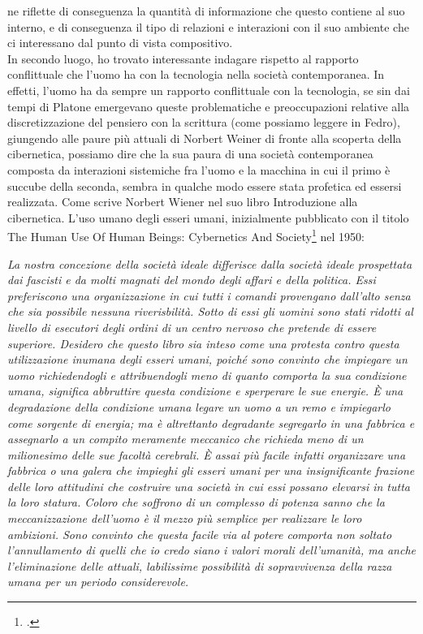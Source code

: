 ne riflette di conseguenza la quantità di informazione che questo contiene al suo interno,
e di conseguenza il tipo di relazioni e interazioni con il suo ambiente che 
ci interessano dal punto di vista compositivo.\\
In secondo luogo, ho trovato interessante indagare rispetto al rapporto conflittuale che l'uomo ha con la tecnologia
nella società contemporanea. 
In effetti, l'uomo ha da sempre un rapporto conflittuale con la tecnologia,
se sin dai tempi di Platone emergevano queste problematiche e preoccupazioni
relative alla discretizzazione del pensiero con la scrittura
(come possiamo leggere in Fedro), 
giungendo alle paure più attuali di Norbert Weiner di fronte
alla scoperta della cibernetica, possiamo dire che la sua paura di una società contemporanea 
composta da interazioni sistemiche fra l'uomo e la macchina
in cui il primo è succube della seconda, sembra in qualche modo essere stata profetica ed essersi realizzata.
Come scrive Norbert Wiener nel suo libro Introduzione alla cibernetica. L'uso umano degli esseri umani,
inizialmente pubblicato con il titolo The Human Use Of Human Beings: Cybernetics And Society\footcite{wiener_introduzione_nodate}
nel 1950:

\begin{center}
    \vspace{0.5cm}
    \textit{La nostra concezione della società ideale differisce dalla società ideale
    prospettata dai fascisti e da molti magnati del mondo degli affari 
    e della politica.
    Essi preferiscono una organizzazione in cui tutti i comandi
    provengano dall'alto senza che sia possibile nessuna riverisbilità.
    Sotto di essi gli uomini sono stati ridotti al livello di esecutori degli ordini
    di un centro nervoso che pretende di essere superiore.
    Desidero che questo libro sia inteso come una protesta contro questa
    utilizzazione inumana degli esseri umani, poiché sono convinto che impiegare
    un uomo richiedendogli e attribuendogli meno di quanto comporta la sua condizione umana,
    significa abbruttire questa condizione e sperperare le sue energie.
    È una degradazione della condizione umana legare un uomo a un remo e impiegarlo come
    sorgente di energia; ma è altrettanto degradante segregarlo in una fabbrica
    e assegnarlo a un compito meramente meccanico che richieda meno di un milionesimo
    delle sue facoltà cerebrali. È assai più facile infatti
    organizzare una fabbrica o una galera che impieghi gli esseri umani
    per una insignificante frazione delle loro attitudini che costruire una 
    società in cui essi possano elevarsi in tutta la loro statura.
    Coloro che soffrono di un complesso di potenza sanno che la meccanizzazione 
    dell'uomo è il mezzo più semplice per realizzare le loro ambizioni.
    Sono convinto che questa facile via al potere comporta non soltato l'annullamento 
    di quelli che io credo siano i valori morali dell'umanità,
    ma anche l'eliminazione delle attuali, labilissime possibilità di
    sopravvivenza della razza umana per un periodo considerevole.
    }
\vspace{0.5cm}
\end{center}

